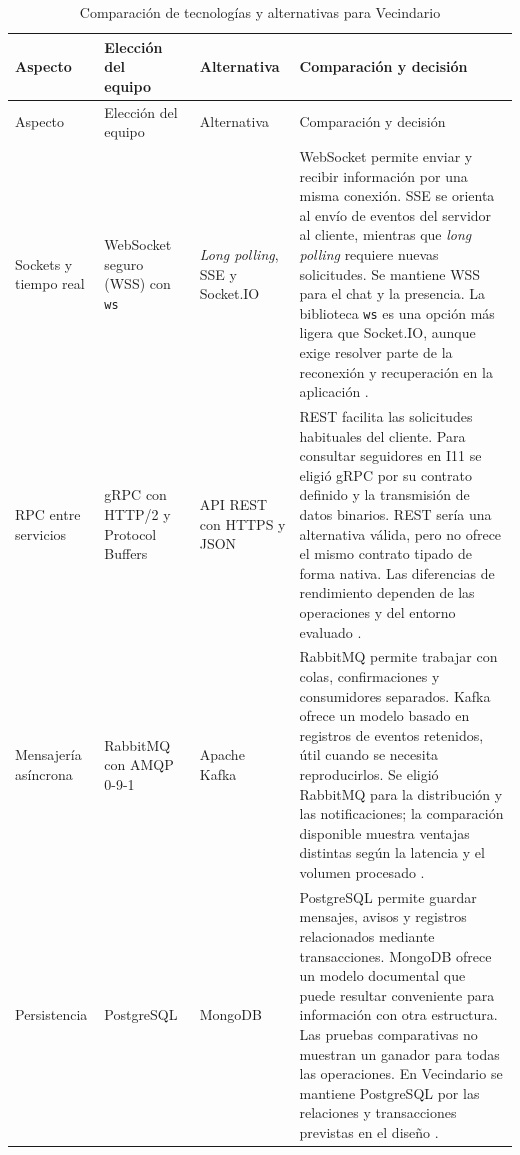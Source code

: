 \documentclass[12pt,a4paper]{article}
\begin{document}
\begin{longtable}{@{}p{2.1cm}p{2.5cm}p{2.8cm}p{6.4cm}@{}}

\caption{Comparación de tecnologías y alternativas para Vecindario}
\label{tab:alternativas} \\

\toprule
Aspecto & \shortstack[l]{Elección del\\equipo} & Alternativa & Comparación y decisión \\
\midrule
\endfirsthead

\toprule
Aspecto & Elección del equipo & Alternativa &
Comparación y decisión \\
\midrule
\endhead

Sockets y
tiempo real &
WebSocket seguro (WSS) con \texttt{ws} &
\textit{Long polling}, SSE y Socket.IO &
WebSocket permite enviar y recibir información por una
misma conexión. SSE se orienta al envío de eventos del
servidor al cliente, mientras que \textit{long polling}
requiere nuevas solicitudes. Se mantiene WSS para el
chat y la presencia. La biblioteca \texttt{ws} es una
opción más ligera que Socket.IO, aunque exige resolver
parte de la reconexión y recuperación en la aplicación
\cite{gracia2024realtime,fernando2025websocket}. \\

\midrule

RPC entre
servicios &
gRPC con HTTP/2
y Protocol Buffers &
API REST con
HTTPS y JSON &
REST facilita las solicitudes habituales del cliente.
Para consultar seguidores en I11 se eligió gRPC por
su contrato definido y la transmisión de datos
binarios. REST sería una alternativa válida, pero
no ofrece el mismo contrato tipado de forma nativa.
Las diferencias de rendimiento dependen de las
operaciones y del entorno evaluado
\cite{kaminski2023protocols,kazanavicius2023communication}. \\

\midrule

Mensajería
asíncrona &
RabbitMQ con
AMQP 0-9-1 &
Apache Kafka &
RabbitMQ permite trabajar con colas, confirmaciones
y consumidores separados. Kafka ofrece un modelo
basado en registros de eventos retenidos, útil
cuando se necesita reproducirlos. Se eligió
RabbitMQ para la distribución y las notificaciones;
la comparación disponible muestra ventajas
distintas según la latencia y el volumen procesado
\cite{maharjan2023queues}. \\

\midrule

Persistencia &
PostgreSQL &
MongoDB &
PostgreSQL permite guardar mensajes, avisos y
registros relacionados mediante transacciones.
MongoDB ofrece un modelo documental que puede
resultar conveniente para información con otra
estructura. Las pruebas comparativas no muestran
un ganador para todas las operaciones. En Vecindario
se mantiene PostgreSQL por las relaciones y
transacciones previstas en el diseño
\cite{olszak2025databases}. \\


\end{longtable}
\end{document}
